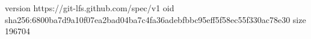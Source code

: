 version https://git-lfs.github.com/spec/v1
oid sha256:6800ba7d9a10f07ea2bad04ba7c4fa36adebfbbc95eff5f58ec55f330ac78e30
size 196704

